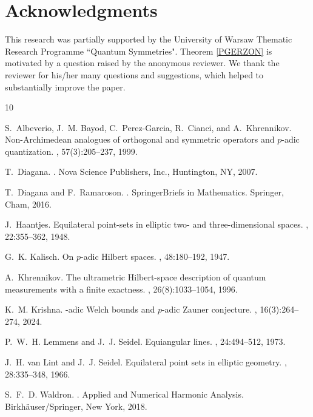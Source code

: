 \documentclass{amsart}
\begin{document}
\section{Acknowledgments}
This research was partially supported by the University of Warsaw Thematic Research Programme ``Quantum Symmetries". Theorem \ref{PGERZON} is motivated by a question raised by the anonymous reviewer. We thank the reviewer for his/her many questions and suggestions, which helped to substantially improve the paper.




 
\begin{thebibliography}{10}
	
	S.~Albeverio, J.~M. Bayod, C.~Perez-Garcia, R.~Cianci, and A.~Khrennikov.
	\newblock Non-{A}rchimedean analogues of orthogonal and symmetric operators and
	{$p$}-adic quantization.
	, 57(3):205--237, 1999.
	
	T.~Diagana.
	.
	\newblock Nova Science Publishers, Inc., Huntington, NY, 2007.
	
	T.~Diagana and F.~Ramaroson.
	.
	\newblock SpringerBriefs in Mathematics. Springer, Cham, 2016.
	
	J.~Haantjes.
	\newblock Equilateral point-sets in elliptic two- and three-dimensional spaces.
	, 22:355--362, 1948.
	
	G.~K. Kalisch.
	\newblock On {$p$}-adic {H}ilbert spaces.
	, 48:180--192, 1947.
	
	A.~Khrennikov.
	\newblock The ultrametric {H}ilbert-space description of quantum measurements
	with a finite exactness.
	, 26(8):1033--1054, 1996.
	
	K.~M. Krishna.
	-adic {W}elch bounds and {$p$}-adic {Z}auner conjecture.
	, 16(3):264--274, 2024.
	
	P.~W.~H. Lemmens and J.~J. Seidel.
	\newblock Equiangular lines.
	, 24:494--512, 1973.
	
	J.~H. van Lint and J.~J. Seidel.
	\newblock Equilateral point sets in elliptic geometry.
	, 28:335--348, 1966.
	
	S.~F.~D. Waldron.
	.
	\newblock Applied and Numerical Harmonic Analysis. Birkh\"{a}user/Springer, New
	York, 2018.
	
\end{thebibliography}

 
\end{document}
